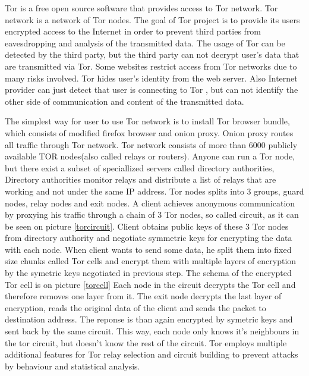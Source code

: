 \documentclass[
  digital, %
  table,   %
  lof,     %
  lot,     %
  oneside
]{fithesis3}
\begin{document}
Tor \parencite{dingledine2004tor} is a free open source software that provides access to Tor network. Tor network is a network of Tor nodes.
The goal of Tor project is to provide its users encrypted access to the Internet in order to prevent third parties
from eavesdropping and analysis of the transmitted data.
The usage of Tor can be detected by the third party, but the third party can not decrypt user's data that are transmitted
 via Tor. Some websites restrict access from Tor networks due to many risks involved.
Tor hides user's identity from the web server. Also Internet provider can just detect that user is connecting to Tor
, but can not identify the other side of communication and content of the transmitted data.

The simplest way for user to use Tor network is to install Tor browser bundle, which consists of
modified firefox browser and onion proxy. Onion proxy routes all traffic through Tor network.
Tor network consists of more than 6000 publicly available TOR nodes(also called relays or routers).
Anyone can run a Tor node, but there exist a subset of speciallized servers called directory authorities,
Directory authorities monitor relays and distribute a list of relays that are working and 
not under the same IP address.
Tor nodes splits into 3 groups, guard nodes, relay nodes and exit nodes.
A client achieves anonymous communication by proxying his traffic through
a chain of 3 Tor nodes, so called circuit, as it can be seen on picture \ref{torcircuit}.
Client obtains public keys of these 3 Tor nodes from directory authority and negotiate
symmetric keys for encrypting the data with each node.
When client wants to send some data, he split them into fixed size chunks
called Tor cells and encrypt them with multiple layers of encryption by the symetric keys negotiated in previous step.
The schema of the encrypted Tor cell is on picture \ref{torcell}
Each node in the circuit decrypts the Tor cell and therefore removes one layer from it.
The exit node decrypts the last layer of encryption, reads the original data of the client and 
sends the packet to destination address. The reponse is than again encrypted by symetric keys
and sent back by the same circuit.
This way, each node only knows it's neighbours in the tor circuit, but doesn't know the rest of the circuit.
Tor employs multiple additional features for Tor relay selection and circuit building to prevent attacks
by behaviour and statistical analysis.
 
\end{document}
